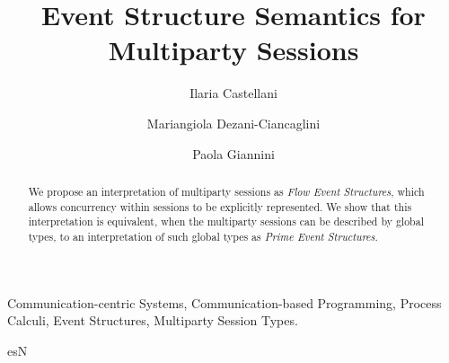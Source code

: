 \documentclass[preprint,11pt]{elsarticle}
\begin{document}
\begin{frontmatter}

\title{Event Structure Semantics for Multiparty Sessions}
\author[1]{Ilaria Castellani
}
\address[1]{INRIA, Universit\'e C\^ote d'Azur, France}
\author[2]{Mariangiola Dezani-Ciancaglini}
\address[2]{Dipartimento di Informatica, Universit\`a di Torino, Italy} 
\author[3]{Paola Giannini}
\address[3]{DiSSTE,Universit\`{a} del Piemonte Orientale, Italy} 

\date{}

  
\begin{abstract} 
   We propose an interpretation of multiparty sessions as \emph{Flow
     Event Structures}, which allows concurrency %
  within sessions 
to be explicitly represented.  We show that this
   interpretation is equivalent, when the multiparty sessions can be
  described by global types, to an interpretation of such global types as
   \emph{Prime Event Structures}. 
\end{abstract}
 \begin{keyword}
Communication-centric Systems, 
Communication-based Programming, 
Process Calculi, Event Structures, Multiparty Session Types.
\end{keyword}
\end{frontmatter}






 {esN}









%
%
%

\newpage
\appendix

\end{document}
